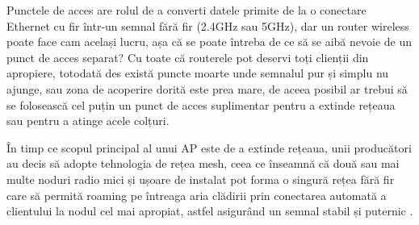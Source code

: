 \documentclass[a4paper,12pt]{report}
\begin{document}
Punctele de acces are rolul de a converti datele primite de la o conectare Ethernet cu fir într-un semnal fără fir (2.4GHz sau 5GHz), dar un router wireless poate face cam același lucru, așa că se poate întreba de ce să se aibă nevoie de un punct de acces separat?
Cu toate că routerele pot deservi toți clienții din apropiere, totodată des există puncte moarte unde semnalul pur și simplu nu ajunge, sau zona de acoperire dorită este prea mare, de aceea posibil ar trebui să se folosească cel puțin un punct de acces suplimentar pentru a extinde rețeaua sau pentru a atinge acele colțuri.

În timp ce scopul principal al unui \ac{AP} este de a extinde rețeaua, unii producători au decis să adopte tehnologia de rețea mesh, ceea ce înseamnă că două sau mai multe noduri radio mici și ușoare de instalat pot forma o singură rețea fără fir care să permită roaming pe întreaga aria clădirii prin conectarea automată a clientului la nodul cel mai apropiat, astfel asigurând un semnal stabil și puternic \cite{wireless_mesh_network_wiki}.
\end{document}
